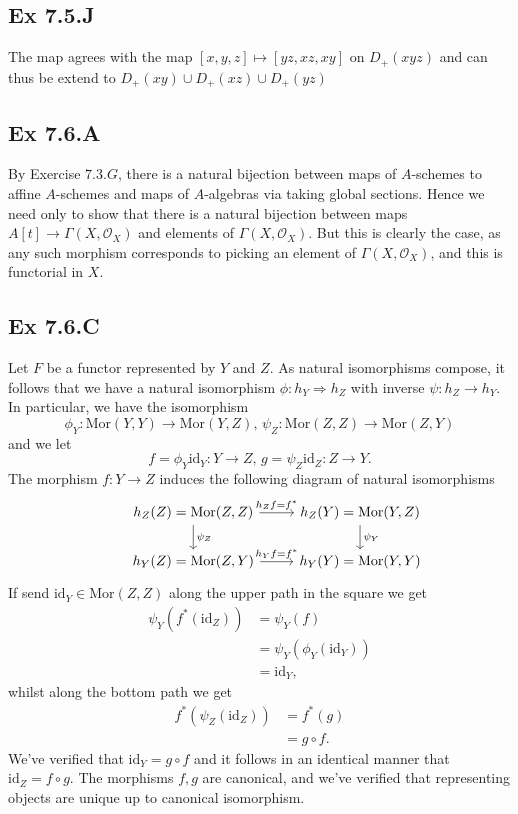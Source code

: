 \documentclass{article}
\theoremstyle{definition}
\newcommand{\Mor}{\text{Mor}}
\newcommand{\id}{\text{id}}
\begin{document}
\subsection*{Ex 7.5.J}

The map agrees with the map $[x, y, z] \mapsto [yz, xz, xy]$ on $D_{+}(xyz)$
and can thus be extend to $D_{+}(xy) \cup D_{+}(xz) \cup D_{+}(yz)$

\subsection*{Ex 7.6.A}

By Exercise $7.3.G$, there is a natural bijection between maps of $A$-schemes
to affine $A$-schemes and maps of $A$-algebras via taking global sections.
Hence we need only to show that there is a natural bijection between maps $A[t]
	\to \Gamma(X, \mathcal{O}_X)$ and elements of $\Gamma(X, \mathcal{O}_X)$. But
this is clearly the case, as any such morphism corresponds to picking an
element of $\Gamma(X, \mathcal{O}_X)$, and this is functorial in $X$.

\subsection*{Ex 7.6.C}

Let $F$ be a functor represented by $Y$ and $Z$. As natural isomorphisms
compose, it follows that we have a natural isomorphism $\phi : h_Y \Rightarrow
	h_Z$ with inverse $\psi : h_Z \to h_Y$. In particular, we have the isomorphism
\[
	\phi_Y : \Mor(Y, Y) \to \Mor(Y, Z), \,
	\psi_Z : \Mor(Z, Z) \to \Mor(Z, Y)
\]
and we let
\[
	f = \phi_Y \id_Y : Y \to Z,\,
	g = \psi_Z \id_Z : Z \to Y.
\]
The morphism $f : Y \to Z$ induces the following diagram of natural isomorphisms
\[
	\begin{tikzcd}
		& h_Z(Z) = \Mor(Z, Z)
		\ar[r, "h_Z f = f^{*}"]
		\ar[d, "\psi_Z"]
		& h_Z(Y) = \Mor(Y, Z)
		\ar[d, "\psi_Y"] \\
		& h_Y(Z) = \Mor(Z, Y)
		\ar[r, "h_Y f = f^{*}"]
		& h_Y(Y) = \Mor(Y, Y)
	\end{tikzcd}
\]
If send $\id_Y \in \Mor(Z, Z)$ along the upper path in the square we get
\begin{align*}
	\psi_Y(f^{*}(\id_Z))
	 & =
	\psi_Y(f)             \\
	 & =
	\psi_Y(\phi_Y(\id_Y)) \\
	 & =
	\id_Y,
\end{align*}
whilst along the bottom path we get
\begin{align*}
	f^{*}(\psi_Z(\id_Z))
	 & =
	f^{*}(g) \\
	 & =
	g \circ f.
\end{align*}
We've verified that $\id_Y = g \circ f$ and it follows in an identical manner
that $\id_Z = f \circ g$. The morphisms $f, g$ are canonical, and we've
verified that representing objects are unique up to canonical isomorphism.
\end{document}
